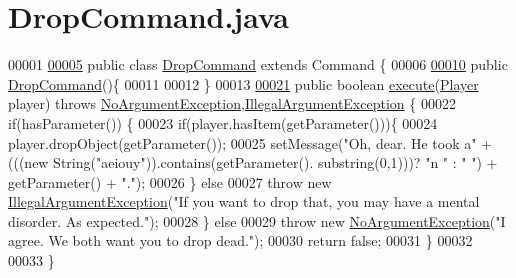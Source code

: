 \hypertarget{DropCommand_8java_source}{\section{Drop\-Command.\-java}
}

\begin{DoxyCode}
00001 
\hypertarget{DropCommand_8java_source_l00005}{}\hyperlink{classDropCommand}{00005} \textcolor{keyword}{public} \textcolor{keyword}{class }\hyperlink{classDropCommand}{DropCommand} \textcolor{keyword}{extends} Command \{
00006 
\hypertarget{DropCommand_8java_source_l00010}{}\hyperlink{classDropCommand_a98a8cc14e98c04bed31cd1580e5e3048}{00010}     \textcolor{keyword}{public} \hyperlink{classDropCommand_a98a8cc14e98c04bed31cd1580e5e3048}{DropCommand}()\{
00011 
00012     \}
00013 
\hypertarget{DropCommand_8java_source_l00021}{}\hyperlink{classDropCommand_a52432de0841ff8eb85d4f115965aecd1}{00021}     \textcolor{keyword}{public} \textcolor{keywordtype}{boolean} \hyperlink{classDropCommand_a52432de0841ff8eb85d4f115965aecd1}{execute}(\hyperlink{classPlayer}{Player} player) \textcolor{keywordflow}{throws} 
      \hyperlink{classNoArgumentException}{NoArgumentException},\hyperlink{classIllegalArgumentException}{IllegalArgumentException} \{
00022         \textcolor{keywordflow}{if}(hasParameter()) \{
00023             \textcolor{keywordflow}{if}(player.hasItem(getParameter()))\{
00024                 player.dropObject(getParameter());
00025                 setMessage(\textcolor{stringliteral}{"Oh, dear. He took a"} + (((\textcolor{keyword}{new} String(\textcolor{stringliteral}{"aeiouy"})).contains(getParameter().
      substring(0,1)))? \textcolor{stringliteral}{"n "} : \textcolor{stringliteral}{" "}) + getParameter() + \textcolor{stringliteral}{"."});
00026             \} \textcolor{keywordflow}{else}
00027                 \textcolor{keywordflow}{throw} \textcolor{keyword}{new} \hyperlink{classIllegalArgumentException}{IllegalArgumentException}(\textcolor{stringliteral}{"If you want to drop that, you
       may have a mental disorder. As expected."});
00028         \} \textcolor{keywordflow}{else}
00029             \textcolor{keywordflow}{throw} \textcolor{keyword}{new} \hyperlink{classNoArgumentException}{NoArgumentException}(\textcolor{stringliteral}{"I agree. We both want you to drop dead."});
00030         \textcolor{keywordflow}{return} \textcolor{keyword}{false};
00031     \}
00032 
00033 \}
\end{DoxyCode}
